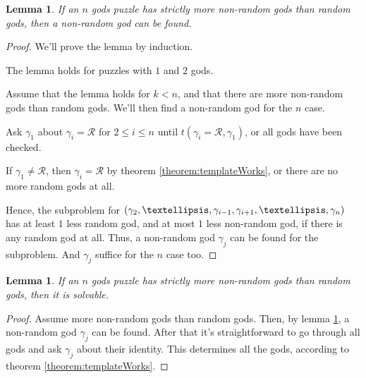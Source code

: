 \documentclass[twoside,twocolumn,a4paper,11pt]{article}
\newtheorem{lemma}[theorem]{Lemma}
\theoremstyle{definition}
\begin{document}
\begin{lemma}
\label{lemma:findingNonR}
If an $n$ gods puzzle has strictly more non-random gods than random gods, 
then a non-random god can be found.  
\end{lemma}
\vspace{-1.2em}
\begin{proof}
We'll prove the lemma by induction.

The lemma holds for puzzles with $1$ and $2$ gods.

Assume that the lemma holds for $k<n$,
and that there are more non-random gods than random gods. 
We'll then find a non-random god for the $n$ case.

Ask $\gamma_1$ about $\gamma_i\!=\!\mathcal{R}$ for $2\leq i\leq n$ until 
$t(\gamma_i\!=\!\mathcal{R},\gamma_1)$, or 
all gods have been checked.

If $\gamma_1\!\neq\! \mathcal{R}$, then $\gamma_i\!=\!\mathcal{R}$ by 
theorem \ref{theorem:templateWorks}, or there are no
more random gods at all.

Hence, the subproblem for 
$(\gamma_2,\ldots,\gamma_{i-1},\gamma_{i+1},\linebreak[1]\ldots,\linebreak[1]\gamma_n)$
has at least $1$ less random god, and at most $1$ less non-random god, 
if there is any random god at all. 
Thus, a non-random god $\gamma_j$ can be found for the subproblem. 
And $\gamma_j$ 
suffice
for the $n$ case too. 
\end{proof}

\begin{lemma}
\label{lemma:RsLTNonRsSolvable}
If an $n$ gods puzzle has strictly more non-random gods than random gods, 
then it is solvable.  
\end{lemma}
\vspace{-1.2em}
\begin{proof}
Assume more non-random gods than random gods. Then, by lemma \ref{lemma:findingNonR},
a non-random god $\gamma_j$ can be found.
After that it's straightforward to go through all gods and ask $\gamma_j$ about their
identity. This determines all the gods, according to theorem \ref{theorem:templateWorks}.
\end{proof}
\end{document}
